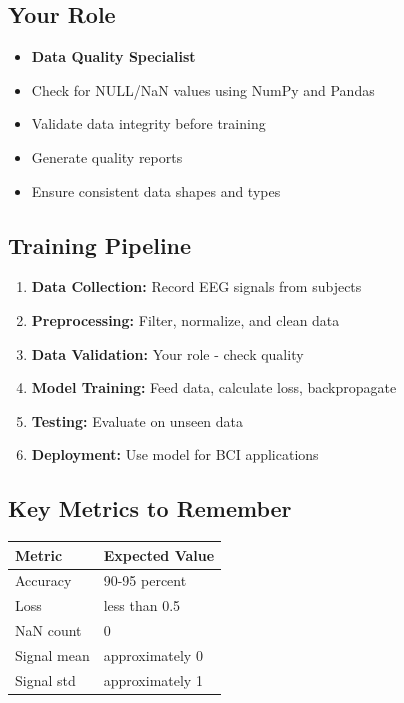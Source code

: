 \documentclass[12pt,a4paper]{article}
\begin{document}
\subsection{Your Role}
\begin{itemize}
    \item \textbf{Data Quality Specialist}
    \item Check for NULL/NaN values using NumPy and Pandas
    \item Validate data integrity before training
    \item Generate quality reports
    \item Ensure consistent data shapes and types
\end{itemize}

\subsection{Training Pipeline}
\begin{enumerate}
    \item \textbf{Data Collection:} Record EEG signals from subjects
    \item \textbf{Preprocessing:} Filter, normalize, and clean data
    \item \textbf{Data Validation:} Your role - check quality
    \item \textbf{Model Training:} Feed data, calculate loss, backpropagate
    \item \textbf{Testing:} Evaluate on unseen data
    \item \textbf{Deployment:} Use model for BCI applications
\end{enumerate}

\subsection{Key Metrics to Remember}
\begin{table}[h]
\centering
\begin{tabular}{|l|l|}
\hline
\textbf{Metric} & \textbf{Expected Value} \\
\hline
Accuracy & 90-95 percent \\
Loss & less than 0.5 \\
NaN count & 0 \\
Signal mean & approximately 0 \\
Signal std & approximately 1 \\
\hline
\end{tabular}
\end{table}
\end{document}
